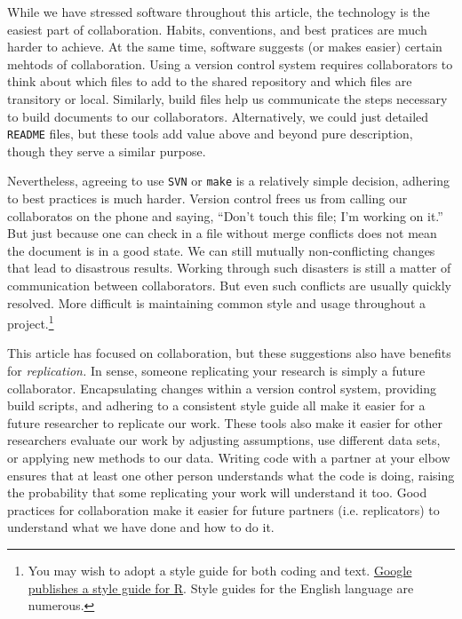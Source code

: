 \documentclass[]{article}
\begin{document}
While we have stressed software throughout this article, the technology is the
easiest part of collaboration. Habits, conventions, and best pratices are much
harder to achieve. At the same time, software suggests (or makes easier)
certain mehtods of collaboration. Using a version control system requires
collaborators to think about which files to add to the shared repository and
which files are transitory or local. Similarly, build files help us
communicate the steps necessary to build documents to our collaborators.
Alternatively, we could just detailed \texttt{README} files, but these tools
add value above and beyond pure description, though they serve a similar
purpose.

Nevertheless, agreeing to use \texttt{SVN} or \texttt{make} is a relatively
simple decision, adhering to best practices is much harder. Version control
frees us from calling our collaboratos on the phone and saying, ``Don't touch
this file; I'm working on it.'' But just because one can check in a file
without merge conflicts does not mean the document is in a good state. We can
still mutually non-conflicting changes that lead to disastrous results.
Working through such disasters is still a matter of communication between
collaborators. But even such conflicts are usually quickly resolved. More
difficult is maintaining common style and usage throughout a
project.\footnote{You may wish to adopt a style guide for both coding and
text.
\href{http://google-styleguide.googlecode.com/svn/trunk/google-r-style.html}
{Google publishes a style guide for
R}.
Style guides for the English language are numerous.}

This article has focused on collaboration, but these suggestions also have
benefits for \emph{replication.} In sense, someone replicating your research
is simply a future collaborator. Encapsulating changes within a version
control system, providing build scripts, and adhering to a consistent style
guide all make it easier for a future researcher to replicate our work. These
tools also make it easier for other researchers evaluate our work by adjusting 
assumptions, use
different data sets, or applying new methods to our data. Writing code with a
partner at your elbow ensures that at least one other person understands what
the code is doing, raising the probability that some replicating your work
will understand it too. Good practices for collaboration make it easier for
future partners (i.e. replicators) to understand what we have done and how to
do it.


\end{document}
